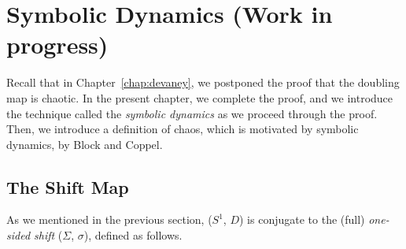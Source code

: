 \documentclass[10pt,twoside]{book}
\begin{document}
\chapter{Symbolic Dynamics (Work in progress)}
\label{chap:symbolic}
Recall that in Chapter~\ref{chap:devaney}, we postponed the proof that the doubling map is chaotic.
In the present chapter, we complete the proof, and we introduce the technique called the \textit{symbolic dynamics} as we proceed through the proof.
Then, we introduce a definition of chaos, which is motivated by symbolic dynamics, by Block and Coppel.


\section{The Shift Map}
As we mentioned in the previous section, ($S^1$, $D$) is conjugate to the (full) \textit{one-sided shift} ($\Sigma$, $\sigma$), defined as follows.
\end{document}
